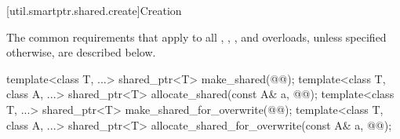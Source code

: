 [util.smartptr.shared.create]{Creation}

\pnum
The common requirements that apply to all
,
,
, and
 overloads,
unless specified otherwise, are described below.

%
%
\begin{itemdecl}
template<class T, ...>
  shared_ptr<T> make_shared(@@);
template<class T, class A, ...>
  shared_ptr<T> allocate_shared(const A& a, @@);
template<class T, ...>
  shared_ptr<T> make_shared_for_overwrite(@@);
template<class T, class A, ...>
  shared_ptr<T> allocate_shared_for_overwrite(const A& a, @@);
\end{itemdecl}

